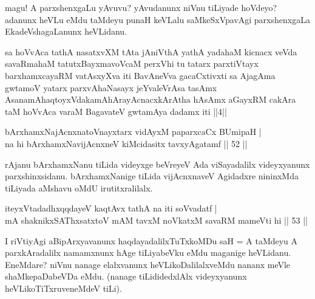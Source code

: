 \begin{artha}
magu! A parxshenxgaLu yAvuvu? yAvudanunx niVnu tiLiyade hoVdeyo? 
adanunx heVLu eMdu taMdeyu punaH keVLalu saMkeSxVpavAgi parxshenxgaLa 
EkadeVshagaLanunx heVLidanu.
\end{artha}


\begin{shl}
\footnotemark[1]sa hoVvAca tathA nasatxvXM tAta jAniVthA yathA yadahaM kicnacx veVda savaRmahaM tatutxBayxmavoVcaM perxVhi tu tatarx parxtiVtayx barxhamxcayaRM vatAsxyXva iti BavAneVva gacaCxtivxti sa AjagAma gwtamoV yatarx parxvAhaNasayx jeYvaleVrAsa tasAmx AsanamAhaqtoyxVdakamAhArayAcnacxkArAtha hAsAmx aGayxRM cakAra taM hoVvAca varaM BagavateV gwtamAya dadamx iti ||4||
\end{shl}

\begin{shl}
bArxhamxNajAcnxnatoV\s nayxtarx vidAyxM paparxcaCx BUmipaH | \\
na hi bArxhamxNavijAcnxneV kiMcidasitx tavxyA\s gatamf \hfill|| 52 || 
\end{shl}

\begin{artha}
rAjanu bArxhamxNanu tiLida videyxge beVreyeV Ada viSayadalilx 
videyxyanunx parxshinxsidanu. bArxhamxNanige tiLida vijAcnxnaveV 
Agidadxre nininxMda tiLiyada aMshavu oMdU irutitxralilalx.
\end{artha}

\begin{shl}
iteyxVtadadhxqqdayeV kaqtAvx tathA na iti soV\s vadatf | \\
mA shaknikxSAThxsatxtoV mAM tavxM noVkatxM savaRM mameVti hi \hfill|| 53 || 
\end{shl} 

\begin{artha}
I riVtiyAgi aBipArxyavanunx haqdayadalilxTuTxkoMDu saH = A taMdeyu A 
parxkAradalilx namamxnunx hAge tiLiyabeVku eMdu maganige heVLidanu. 
EneMdare? niVnu nanage elalxvanunx heVLikoDalilalxveMdu nananx meVle 
shaMkepaDabeVDa eMdu. (nanage tiLididedxlAlx videyxyanunx 
heVLikoTiTxruveneMdeV tiLi).
\end{artha}

